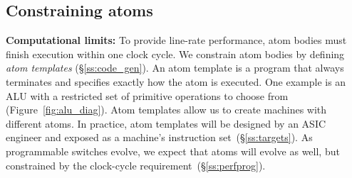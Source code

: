 \subsection{Constraining atoms}
\label{s:atomConstraints}

\textbf{Computational limits:} To provide line-rate performance, atom
bodies must finish execution within one clock cycle. We
constrain atom bodies by defining {\it atom templates}
(\S\ref{ss:code_gen}).  An atom template is a program that always
terminates and specifies exactly how the atom is executed. One example
is an ALU with a restricted set of primitive operations to choose from
(Figure~\ref{fig:alu_diag}). Atom templates allow us to create
\absmachine machines with different atoms.  In practice, atom
templates will be designed by an ASIC engineer and exposed as a
machine's instruction set~(\S\ref{ss:targets}).  As programmable
switches evolve, we expect that atoms will evolve as well, but
constrained by the clock-cycle requirement~(\S\ref{ss:perfprog}).

